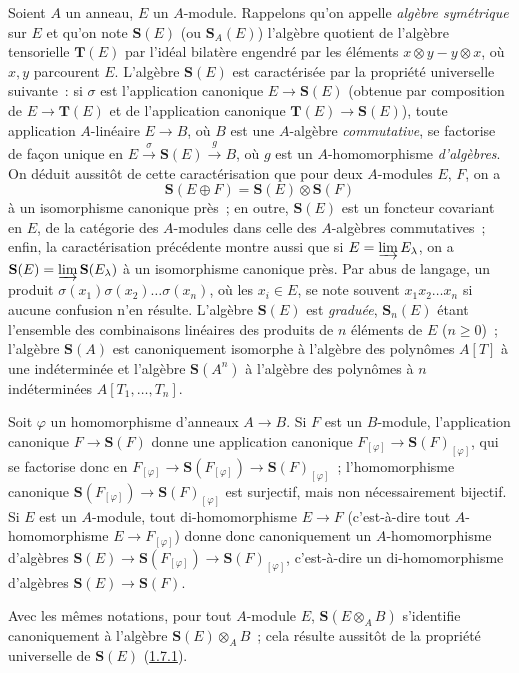 \begin{env}[1.7.1]
\label{II.1.7.1-fr}
Soient $A$ un anneau, $E$ un $A$-module. Rappelons qu'on appelle \emph{algèbre
symétrique} sur $E$ et qu'on note $\mathbf{S}(E)$ (ou $\mathbf{S}_A(E)$)
l'algèbre quotient de l'algèbre tensorielle $\mathbf{T}(E)$ par l'idéal
bilatère engendré par les éléments $x\otimes y-y\otimes x$, où $x,y$
parcourent $E$. L'algèbre $\mathbf{S}(E)$ est caractérisée par la propriété
universelle suivante~: si $\sigma$ est l'application canonique
$E\to\mathbf{S}(E)$ (obtenue par composition de $E\to\mathbf{T}(E)$ et de
l'application canonique $\mathbf{T}(E)\to\mathbf{S}(E)$), toute application
$A$-linéaire $E\to B$, où $B$ est une $A$-algèbre \emph{commutative}, se
factorise de façon unique en
$E\xrightarrow{\sigma}\mathbf{S}(E)\xrightarrow{g}B$, où $g$ est un
$A$-homomorphisme \emph{d'algèbres}. On déduit aussitôt de cette
caractérisation que pour deux $A$-modules $E$, $F$, on a
\[
  \mathbf{S}(E\oplus F)=\mathbf{S}(E)\otimes\mathbf{S}(F)
\]
à un isomorphisme canonique près~; en outre, $\mathbf{S}(E)$ est un foncteur
covariant en $E$, de la catégorie des $A$-modules dans celle des $A$-algèbres
commutatives~; enfin, la caractérisation précédente montre aussi que si
$E=\varinjlim E_\lambda$, on a
$\mathbf{S}(E)=\varinjlim\mathbf{S}(E_\lambda)$ à un isomorphisme canonique
près. Par abus de langage, un produit
$\sigma(x_1)\sigma(x_2)\ldots\sigma(x_n)$, où les $x_i\in E$, se note souvent
$x_1x_2\ldots x_n$ si aucune confusion n'en résulte. L'algèbre
$\mathbf{S}(E)$ est \emph{graduée}, $\mathbf{S}_n(E)$ étant l'ensemble des
combinaisons linéaires des produits de $n$ éléments de $E$ ($n\geq 0$)~;
l'algèbre $\mathbf{S}(A)$ est canoniquement isomorphe à l'algèbre des
polynômes $A[T]$ à une indéterminée et l'algèbre $\mathbf{S}(A^n)$ à
l'algèbre des polynômes à $n$ indéterminées $A[T_1,\ldots,T_n]$.
\end{env}

\begin{env}[1.7.2]
\label{II.1.7.2-fr}
Soit $\varphi$ un homomorphisme d'anneaux $A\to B$. Si $F$ est un $B$-module,
l'application canonique $F\to\mathbf{S}(F)$ donne une application canonique
$F_{[\varphi]}\to\mathbf{S}(F)_{[\varphi]}$, qui se factorise donc en
$F_{[\varphi]}\to\mathbf{S}(F_{[\varphi]})\to
\mathbf{S}(F)_{[\varphi]}$~; l'homomorphisme canonique
$\mathbf{S}(F_{[\varphi]})\to\mathbf{S}(F)_{[\varphi]}$ est surjectif, mais
non nécessairement bijectif. Si $E$ est un $A$-module, tout di-homomorphisme
$E\to F$ (c'est-à-dire tout $A$-homomorphisme $E\to F_{[\varphi]}$) donne donc
canoniquement un $A$-homomorphisme d'algèbres
$\mathbf{S}(E)\to\mathbf{S}(F_{[\varphi]})\to
\mathbf{S}(F)_{[\varphi]}$, c'est-à-dire un di-homomorphisme d'algèbres
$\mathbf{S}(E)\to\mathbf{S}(F)$.

Avec les mêmes notations, pour tout $A$-module $E$,
$\mathbf{S}(E\otimes_A B)$ s'identifie canoniquement à l'algèbre
$\mathbf{S}(E)\otimes_A B$~; cela résulte aussitôt de la propriété universelle
de $\mathbf{S}(E)$ (\hyperref[II.1.7.1-fr]{1.7.1}).
\end{env}

